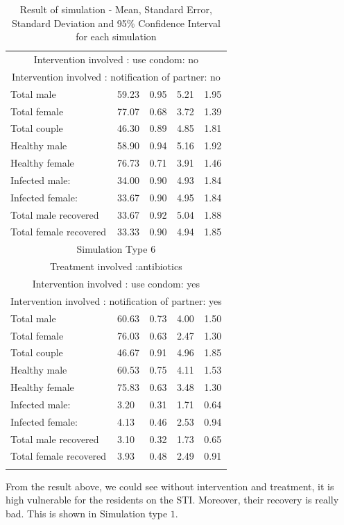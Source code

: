 \documentclass{article}
\begin{document}
\begin{normalsize}
\begin{longtable}{|p{5cm}|p{3cm}|p{3cm}|p{3cm}|p{3cm}|}
	\multicolumn{5}{|c|}{Intervention involved : use condom: no} \\
	\multicolumn{5}{|c|}{Intervention involved : notification of partner: no} \\
	\hline
	Total male & 59.23 & 0.95 & 5.21 & 1.95\\
	Total female & 77.07 & 0.68 & 3.72 & 1.39\\
	Total couple & 46.30 & 0.89 & 4.85 & 1.81\\
	Healthy male & 58.90 & 0.94 & 5.16 & 1.92\\
	Healthy female & 76.73 & 0.71 & 3.91 & 1.46\\
	Infected  male: & 34.00 & 0.90 & 4.93 & 1.84\\
	Infected female: & 33.67 & 0.90 & 4.95 & 1.84\\
	Total male recovered & 33.67 & 0.92 & 5.04 & 1.88\\
	Total female recovered & 33.33 & 0.90 & 4.94 & 1.85\\		
	\hline
	\multicolumn{5}{|c|}{Simulation Type $6$} \\
	\multicolumn{5}{|c|}{Treatment involved :antibiotics} \\
	\multicolumn{5}{|c|}{Intervention involved : use condom: yes} \\
	\multicolumn{5}{|c|}{Intervention involved : notification of partner: yes} \\
	\hline
	Total male & 60.63 & 0.73 & 4.00 & 1.50\\
	Total female & 76.03 & 0.63 & 2.47 & 1.30\\
	Total couple & 46.67 & 0.91 & 4.96 & 1.85\\
	Healthy male & 60.53 & 0.75 & 4.11 & 1.53\\
	Healthy female & 75.83 & 0.63 & 3.48 & 1.30\\
	Infected male: & 3.20 & 0.31 &1.71 & 0.64\\
	Infected female: & 4.13 & 0.46 & 2.53 & 0.94\\
	Total male recovered & 3.10 & 0.32 & 1.73 & 0.65\\
	Total female recovered & 3.93 & 0.48 & 2.49 & 0.91\\
	\hline
	\caption{Result of simulation - Mean, Standard Error, Standard Deviation and 95\% Confidence Interval for each simulation}
	\label{tab:result2}
\end{longtable}

From the result above, we could see without intervention and treatment, it is high vulnerable for the residents on the STI. Moreover, their recovery is really bad. This is shown in Simulation type $1$. 


\end{normalsize}
\end{document}
